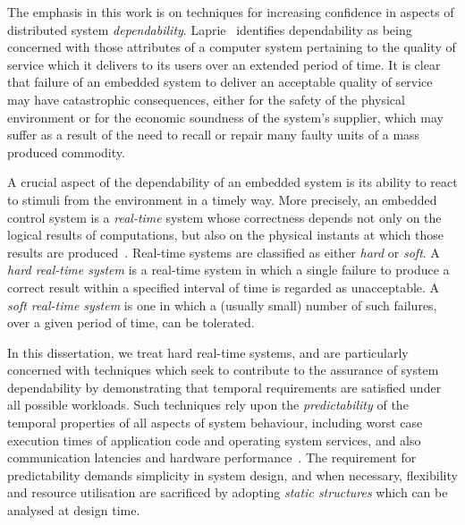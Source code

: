 The emphasis in this work is on techniques for increasing confidence
in aspects of distributed system
\emph{dependability}. Laprie~\cite{lap:90} identifies dependability as
being concerned with those attributes of a computer system pertaining
to the quality of service which it delivers to its users over an
extended period of time. It is clear that failure of an embedded
system to deliver an acceptable quality of service may have
catastrophic consequences, either for the safety of the physical
environment or for the economic soundness of the system's supplier,
which may suffer as a result of the need to recall or repair many
faulty units of a mass produced commodity.

A crucial aspect of the dependability of an embedded system is its
ability to react to stimuli from the environment in a timely
way. More precisely, an embedded control system is a
\emph{real-time} system whose correctness depends not only on the
logical results of computations, but also on the physical instants at
which those results are produced~\cite{sta:88a}.  Real-time systems
are classified as either \emph{hard} or \emph{soft}. A
\emph{hard real-time system} is a real-time system in which a single
failure to produce a correct result within a specified interval of
time is regarded as unacceptable. A \emph{soft real-time system} is
one in which a (usually small) number of such failures, over a given
period of time, can be tolerated.
  
In this dissertation, we treat hard real-time systems, and are
particularly concerned with techniques which seek to contribute to the
assurance of system dependability by demonstrating that temporal
requirements are satisfied under all possible workloads. Such
techniques rely upon the \emph{predictability} of the temporal
properties of all aspects of system behaviour, including worst case
execution times of application code and operating system services, and
also communication latencies and hardware
performance~\cite{cvg:98,hal:93,hs:91}. The requirement for
predictability demands simplicity in system design, and when
necessary, flexibility and resource utilisation are sacrificed by
adopting \emph{static structures} which can be analysed at design
time.

